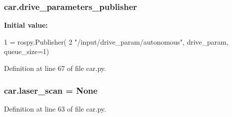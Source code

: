 \subsubsection[{\texorpdfstring{drive\+\_\+parameters\+\_\+publisher}{drive_parameters_publisher}}]{\setlength{\rightskip}{0pt plus 5cm}car.\+drive\+\_\+parameters\+\_\+publisher}\hypertarget{namespacecar_a13e00317c653b099b79b16607d5197ba}{}\label{namespacecar_a13e00317c653b099b79b16607d5197ba}
{\bfseries Initial value\+:}
\begin{DoxyCode}
1 = rospy.Publisher(
2     \textcolor{stringliteral}{"/input/drive\_param/autonomous"}, drive\_param, queue\_size=1)
\end{DoxyCode}


Definition at line 67 of file car.\+py.

\subsubsection[{\texorpdfstring{laser\+\_\+scan}{laser_scan}}]{\setlength{\rightskip}{0pt plus 5cm}car.\+laser\+\_\+scan = None}\hypertarget{namespacecar_a4ba098e8f3df859abceb50544afdec9f}{}\label{namespacecar_a4ba098e8f3df859abceb50544afdec9f}


Definition at line 63 of file car.\+py.

